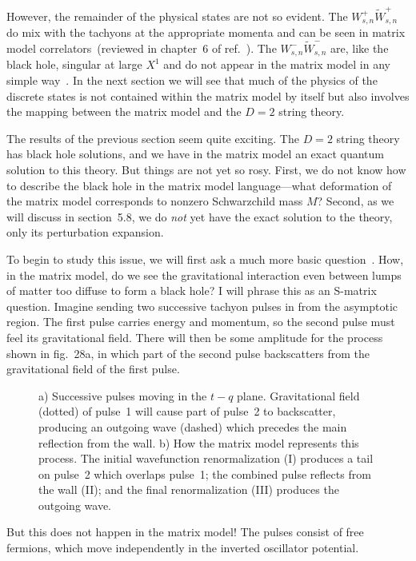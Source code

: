 However, the remainder of the physical states are not so evident.
The $W_{s,n}^{+}\tilde W_{s,n}^{+}$ do mix with the tachyons
at the appropriate momenta and can be seen in matrix
model correlators~(reviewed in chapter~6 of ref.~\cite{Krev}).  The
$W_{s,n}^{-}\tilde W_{s,n}^{-}$ are, like the black hole, singular at
large $X^1$ and do not appear in the matrix model in any simple
way~\cite{Sliou}.  In the next section we will see that
much of the physics of the discrete states is not contained within
the matrix model by itself but also involves the mapping between the
matrix model and the $D=2$ string theory.


The results of the previous section seem quite exciting.  The $D=2$
string theory has black hole solutions, and we have in the matrix
model an exact quantum solution to this theory.  But things are not
yet so rosy.  First, we do not know how to describe the black hole
in the matrix model language---what deformation of the matrix model
corresponds to nonzero Schwarzchild mass $M$?  Second, as we will
discuss in section~5.8, we do {\it not} yet have the exact solution
to the theory, only its perturbation expansion.

To begin to study this issue, we will first ask a much more basic
question~\cite{NP}.  How, in the matrix model, do we see the
gravitational interaction even between lumps of matter too diffuse to
form a black hole?  I will phrase this as an S-matrix question. 
Imagine sending two successive tachyon pulses in from the asymptotic
region.  The first pulse carries energy and momentum, so the second
pulse must feel its gravitational field.  There will then be some
amplitude for the process shown in fig.~28a, in which part of the
second pulse backscatters from the gravitational field of the first
pulse. \begin{figure}
\begin{center}
\leavevmode
{}
\end{center}
\caption[]{a) Successive pulses moving in the $t-q$ plane. 
Gravitational field (dotted) of pulse~1 will cause part of pulse~2
to backscatter, producing an outgoing wave (dashed) which precedes
the main reflection from the wall.
b) How the matrix model represents this process.  The
initial wavefunction renormalization (I) produces a tail on pulse~2
which overlaps pulse~1; the combined pulse reflects from the wall
(II); and the final renormalization (III) produces the outgoing wave.
}
\end{figure}
But this does not happen in the matrix model!  The pulses consist
of free fermions, which move independently in the inverted
oscillator potential.

